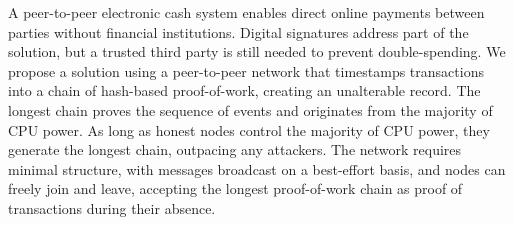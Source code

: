 A peer-to-peer electronic cash system enables direct online payments between parties without financial institutions. Digital signatures address part of the solution, but a trusted third party is still needed to prevent double-spending. We propose a solution using a peer-to-peer network that timestamps transactions into a chain of hash-based proof-of-work, creating an unalterable record. The longest chain proves the sequence of events and originates from the majority of CPU power. As long as honest nodes control the majority of CPU power, they generate the longest chain, outpacing any attackers. The network requires minimal structure, with messages broadcast on a best-effort basis, and nodes can freely join and leave, accepting the longest proof-of-work chain as proof of transactions during their absence.